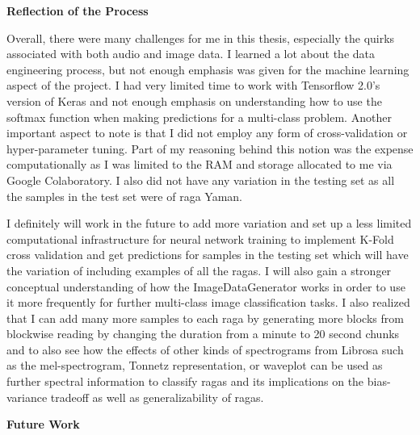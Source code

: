 \doublespacing
\setlength{\parindent}{1cm}

\begin{flushleft}
  \textbf{Reflection of the Process}
\end{flushleft}

Overall, there were many challenges for me in this thesis, especially the quirks associated with both audio and image data. I learned a lot about the data engineering process, but not enough emphasis was given for the machine learning aspect of the project. I had very limited time to work with Tensorflow 2.0's version of Keras and not enough emphasis on understanding how to use the softmax function when making predictions for a multi-class problem. Another important aspect to note is that I did not employ any form of cross-validation or hyper-parameter tuning. Part of my reasoning behind this notion was the expense computationally as I was limited to the RAM and storage allocated to me via Google Colaboratory. I also did not have any variation in the testing set as all the samples in the test set were of raga Yaman.
\par
I definitely will work in the future to add more variation and set up a less limited computational infrastructure for neural network training to implement K-Fold cross validation and get predictions for samples in the testing set which will have the variation of including examples of all the ragas. I will also gain a stronger conceptual understanding of how the ImageDataGenerator works in order to use it more frequently for further multi-class image classification tasks. I also realized that I can add many more samples to each raga by generating more blocks from blockwise reading by changing the duration from a minute to 20 second chunks and to also see how the effects of other kinds of spectrograms from Librosa such as the mel-spectrogram, Tonnetz representation, or waveplot can be used as further spectral information to classify ragas and its implications on the bias-variance tradeoff as well as generalizability of ragas.

\begin{flushleft}
  \textbf{Future Work}
\end{flushleft}


